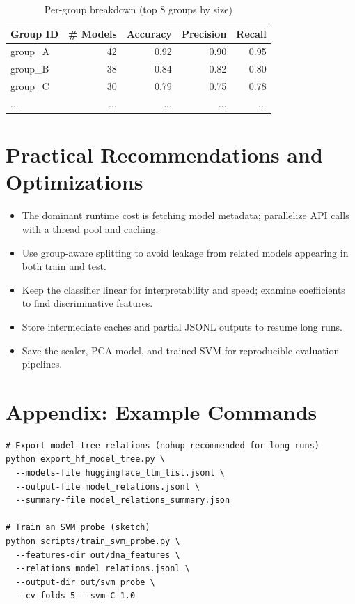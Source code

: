 \documentclass[11pt,a4paper]{article}
\begin{document}
\begin{table}[ht]
\centering
\caption{Per-group breakdown (top 8 groups by size)}
\begin{tabular}{lrrrr}
\toprule
Group ID & \# Models & Accuracy & Precision & Recall \\
\midrule
group\_A & 42 & 0.92 & 0.90 & 0.95 \\
group\_B & 38 & 0.84 & 0.82 & 0.80 \\
group\_C & 30 & 0.79 & 0.75 & 0.78 \\
... & ... & ... & ... & ... \\
\bottomrule
\end{tabular}
\end{table}

\section{Practical Recommendations and Optimizations}
\begin{itemize}
  \item The dominant runtime cost is fetching model metadata; parallelize API calls with a thread pool and caching.
  \item Use group-aware splitting to avoid leakage from related models appearing in both train and test.
  \item Keep the classifier linear for interpretability and speed; examine coefficients to find discriminative features.
  \item Store intermediate caches and partial JSONL outputs to resume long runs.
  \item Save the scaler, PCA model, and trained SVM for reproducible evaluation pipelines.
\end{itemize}

\section{Appendix: Example Commands}
\begin{verbatim}
# Export model-tree relations (nohup recommended for long runs)
python export_hf_model_tree.py \
  --models-file huggingface_llm_list.jsonl \
  --output-file model_relations.jsonl \
  --summary-file model_relations_summary.json

# Train an SVM probe (sketch)
python scripts/train_svm_probe.py \
  --features-dir out/dna_features \
  --relations model_relations.jsonl \
  --output-dir out/svm_probe \
  --cv-folds 5 --svm-C 1.0
\end{verbatim}
\end{document}
